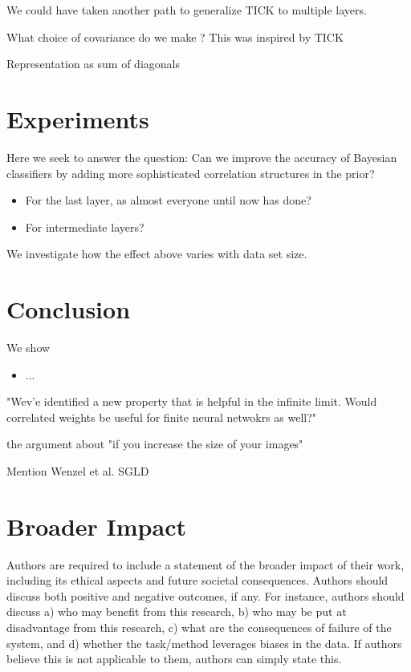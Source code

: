\documentclass{article}
\theoremstyle{definition}
\begin{document}
We could have taken another path to generalize TICK to multiple layers.

What choice of covariance do we make ?
This was inspired by TICK

Representation as sum of diagonals

\section{Experiments}
Here we seek to answer the question:
 Can we improve the accuracy of Bayesian classifiers by adding more sophisticated correlation structures in the prior?
\begin{itemize}
    \item For the last layer, as almost everyone until now has done?
    \item For intermediate layers?
\end{itemize}

We investigate how the effect above varies with data set size.



\section{Conclusion}
We show
\begin{itemize}
    \item ...
\end{itemize}

"Wev'e identified a new property that is helpful in the infinite limit. Would correlated weights be useful for finite neural netwokrs as well?"

the argument about "if you increase the size of your images" 

Mention Wenzel et al. SGLD

\section*{Broader Impact}

Authors are required to include a statement of the broader impact of their work, including its ethical aspects and future societal consequences. 
Authors should discuss both positive and negative outcomes, if any. For instance, authors should discuss a) 
who may benefit from this research, b) who may be put at disadvantage from this research, c) what are the consequences of failure of the system, and d) whether the task/method leverages
biases in the data. If authors believe this is not applicable to them, authors can simply state this.
\end{document}
